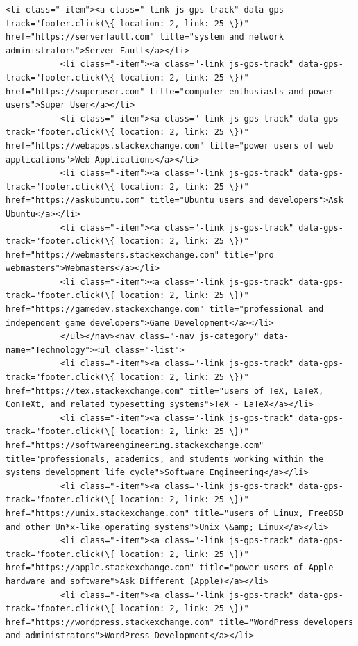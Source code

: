 \documentclass[11pt]{article}
\begin{document}
\begin{Verbatim}[commandchars=\\\{\}]
           <li class="-item"><a class="-link js-gps-track" data-gps-track="footer.click(\{ location: 2, link: 25 \})" href="https://serverfault.com" title="system and network administrators">Server Fault</a></li>
           <li class="-item"><a class="-link js-gps-track" data-gps-track="footer.click(\{ location: 2, link: 25 \})" href="https://superuser.com" title="computer enthusiasts and power users">Super User</a></li>
           <li class="-item"><a class="-link js-gps-track" data-gps-track="footer.click(\{ location: 2, link: 25 \})" href="https://webapps.stackexchange.com" title="power users of web applications">Web Applications</a></li>
           <li class="-item"><a class="-link js-gps-track" data-gps-track="footer.click(\{ location: 2, link: 25 \})" href="https://askubuntu.com" title="Ubuntu users and developers">Ask Ubuntu</a></li>
           <li class="-item"><a class="-link js-gps-track" data-gps-track="footer.click(\{ location: 2, link: 25 \})" href="https://webmasters.stackexchange.com" title="pro webmasters">Webmasters</a></li>
           <li class="-item"><a class="-link js-gps-track" data-gps-track="footer.click(\{ location: 2, link: 25 \})" href="https://gamedev.stackexchange.com" title="professional and independent game developers">Game Development</a></li>
           </ul></nav><nav class="-nav js-category" data-name="Technology"><ul class="-list">
           <li class="-item"><a class="-link js-gps-track" data-gps-track="footer.click(\{ location: 2, link: 25 \})" href="https://tex.stackexchange.com" title="users of TeX, LaTeX, ConTeXt, and related typesetting systems">TeX - LaTeX</a></li>
           <li class="-item"><a class="-link js-gps-track" data-gps-track="footer.click(\{ location: 2, link: 25 \})" href="https://softwareengineering.stackexchange.com" title="professionals, academics, and students working within the systems development life cycle">Software Engineering</a></li>
           <li class="-item"><a class="-link js-gps-track" data-gps-track="footer.click(\{ location: 2, link: 25 \})" href="https://unix.stackexchange.com" title="users of Linux, FreeBSD and other Un*x-like operating systems">Unix \&amp; Linux</a></li>
           <li class="-item"><a class="-link js-gps-track" data-gps-track="footer.click(\{ location: 2, link: 25 \})" href="https://apple.stackexchange.com" title="power users of Apple hardware and software">Ask Different (Apple)</a></li>
           <li class="-item"><a class="-link js-gps-track" data-gps-track="footer.click(\{ location: 2, link: 25 \})" href="https://wordpress.stackexchange.com" title="WordPress developers and administrators">WordPress Development</a></li>

\end{Verbatim}
\end{document}
